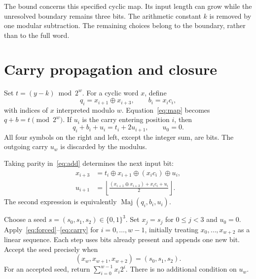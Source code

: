 \documentclass[11pt,a4paper]{article}
\newcommand{\B}{\{0,1\}}
\newcommand{\xor}{\mathbin{\oplus}}
\DeclareMathOperator{\Maj}{Maj}
\begin{document}
The bound concerns this specified cyclic map. Its input length can grow while the unresolved boundary remains three bits. The arithmetic constant $k$ is removed by one modular subtraction. The remaining choices belong to the boundary, rather than to the full word.

\section{Carry propagation and closure}\label{sec:recurrence}
Set $t=(y-k)\bmod 2^w$. For a cyclic word $x$, define
\[
 q_i=x_{i+1}\xor x_{i+3},\qquad b_i=x_ic_i,
\]
with indices of $x$ interpreted modulo $w$. Equation~\eqref{eq:map} becomes $q+b=t\pmod{2^w}$. If $u_i$ is the carry entering position $i$, then
\begin{equation}\label{eq:add}
 q_i+b_i+u_i=t_i+2u_{i+1},\qquad u_0=0.
\end{equation}
All four symbols on the right and left, except the integer sum, are bits. The outgoing carry $u_w$ is discarded by the modulus.

Taking parity in~\eqref{eq:add} determines the next input bit:
\begin{align}
 x_{i+3}&=t_i\xor x_{i+1}\xor(x_ic_i)\xor u_i,
 \label{eq:forced}\\
 u_{i+1}&=\left\lfloor
 \frac{(x_{i+1}\xor x_{i+3})+x_ic_i+u_i}{2}
 \right\rfloor.
 \label{eq:carry}
\end{align}
The second expression is equivalently $\Maj(q_i,b_i,u_i)$.

Choose a seed $s=(s_0,s_1,s_2)\in\B^3$. Set $x_j=s_j$ for $0\le j<3$ and $u_0=0$. Apply~\eqref{eq:forced}--\eqref{eq:carry} for $i=0,\ldots,w-1$, initially treating $x_0,\ldots,x_{w+2}$ as a linear sequence. Each step uses bits already present and appends one new bit. Accept the seed precisely when
\begin{equation}\label{eq:closure}
 (x_w,x_{w+1},x_{w+2})=(s_0,s_1,s_2).
\end{equation}
For an accepted seed, return $\sum_{i=0}^{w-1}x_i2^i$.
There is no additional condition on $u_w$.
\end{document}
